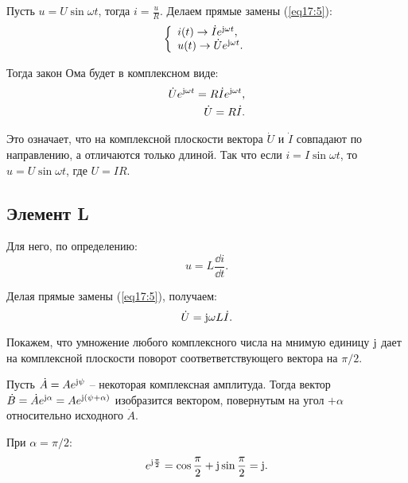         Пусть \( u = U\sin\omega t \), тогда \( i = \frac{u}{R} \). Делаем
        прямые замены (\ref{eq17:5}):
        \[
            \left\{
                \begin{array}{l}
                    i(t) \to \dot{I}e^{\mathrm{j}\omega t}, \\
                    u(t) \to \dot{U}e^{\mathrm{j}\omega t}.
                \end{array}
            \right.
        \]
        
        Тогда закон Ома будет в комплексном виде:
        \begin{align}
            \dot{U}e^{\mathrm{j}\omega t} = R\dot{I}e^{\mathrm{j}\omega t}, \nonumber \\
            \dot{U} = R\dot{I}. \label{eq17:6}
        \end{align}
        
        Это означает, что на комплексной плоскости вектора \( \dot{U} \) и
        \( \dot{I} \) совпадают по направлению, а отличаются только длиной. Так
        что если \( i = I\sin\omega t \), то \( u = U\sin\omega t \), где
        \( U = IR \).
    
    \subsection{Элемент L}
    
        Для него, по определению:
        \[
            u = L\frac{\dd i}{\dd t}.
        \]
        
        Делая прямые замены (\ref{eq17:5}), получаем:
        \begin{equation}
            \dot{U} = \mathrm{j}\omega L\dot{I}.
             \label{eq17:7}
        \end{equation}
        
        Покажем, что умножение любого комплексного числа на мнимую единицу
        \( \mathrm{j} \) дает на комплексной плоскости поворот соответветствующего
        вектора на \( \pi/2 \).
        
        Пусть \( \dot{A} = Ae^{\mathrm{j}\psi} \) -- некоторая комплексная
        амплитуда. Тогда вектор \( \dot{B} = \dot{A}e^{\mathrm{j}\alpha} =
        Ae^{\mathrm{j}(\psi + \alpha)} \) изобразится вектором, повернутым на угол
        \( +\alpha \) относительно исходного \( \dot{A} \).
        
        При \( \alpha = \pi/2 \):
        \[
            e^{\mathrm{j}\frac{\pi}{2}} = \cos\frac{\pi}{2} +
            \mathrm{j}\sin\frac{\pi}{2} = \mathrm{j}.
        \]
        
